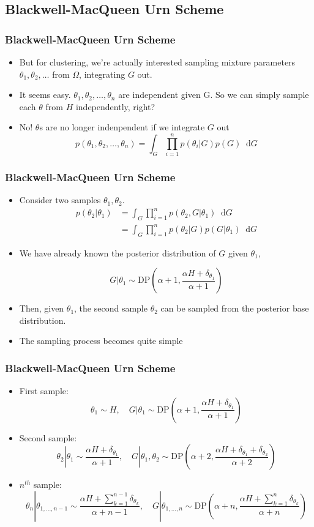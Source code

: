 \documentclass{beamer}
\newcommand*\diff{\mathop{}\!\mathrm{d}}
\begin{document}
\subsection{Blackwell-MacQueen Urn Scheme}
\begin{frame}
\frametitle{Blackwell-MacQueen Urn Scheme}
	\begin{itemize}
		\item{But for clustering, we're actually interested sampling mixture parameters $\theta_1, \theta_2, \ldots$ from $\Omega$, integrating $G$ out.}
		\item It seems easy. $\theta_1, \theta_2, \ldots, \theta_n$ are independent given G. So we can simply sample each $\theta$ from $H$ independently, right?
		\item No! $\theta$s are no longer indenpendent if we integrate $G$ out
		\[
		p(\theta_1, \theta_2, \ldots, \theta_n) = \int_G \prod_{i=1}^{n} p(\theta_i|G)p(G) \diff G
		\]
	\end{itemize}
\end{frame}
\begin{frame}
	\frametitle{Blackwell-MacQueen Urn Scheme}
	\begin{itemize}
		\item Consider two samples $\theta_1, \theta_2$.
		\begin{align*}
		p(\theta_2 | \theta_1) & = \int_G \prod_{i=1}^{n} p(\theta_2, G| \theta_1) \diff G \\
		& = \int_G \prod_{i=1}^{n} p(\theta_2|G) p(G|\theta_1) \diff G 
		\end{align*}
		\item We have already known the posterior distribution of $G$ given $\theta_1$,
		
		\[
		G|\theta_1 \sim \text{DP}(\alpha+1, \frac{\alpha H + \delta_{\theta_1}}{\alpha+1})
		\]
		\item Then, given $\theta_1$, the second sample $\theta_2$ can be sampled from the posterior base distribution.
		\item The sampling process becomes quite simple		
	\end{itemize}
\end{frame}
\begin{frame}
	\frametitle{Blackwell-MacQueen Urn Scheme}
	\begin{itemize}
		\item First sample: 
			\[ \theta_1 \sim H, \quad G|\theta_1 \sim \text{DP}(\alpha+1, \frac{\alpha H + \delta_{\theta_1}}{\alpha+1}) \]
		\item Second sample:
			\[ \theta_2|\theta_1 \sim \frac{\alpha H + \delta_{\theta_1}}{\alpha+1}, \quad G|\theta_1,\theta_2 \sim \text{DP}(\alpha+2, \frac{\alpha H + \delta_{\theta_1} + \delta_{\theta_2}}{\alpha+2}) \]
		\item $n^{th}$ sample:
			\[ \theta_n|\theta_{1,\ldots,n-1} \sim \frac{\alpha H + \sum_{k=1}^{n-1}\delta_{\theta_k}}{\alpha+n-1}, \quad G|\theta_{1,\ldots,n} \sim \text{DP}(\alpha+n, \frac{\alpha H + \sum_{k=1}^{n}\delta_{\theta_k}}{\alpha+n}) \]
	\end{itemize}
\end{frame}
\end{document}
